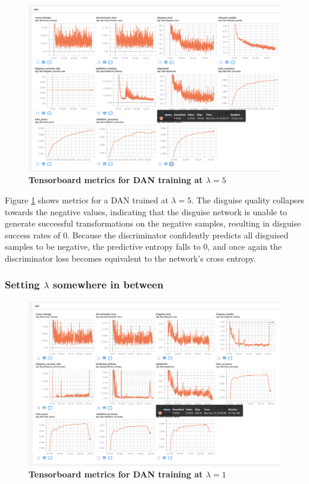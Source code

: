 \documentclass{proc}
\begin{document}
\begin{figure}[h!]
	\begin{center}
		\includegraphics*[scale=0.3]{../figures/tensorboard-exp-03.png}
		\caption{\textbf{Tensorboard metrics for DAN training at $\lambda = 5$}}
		\label{fig:tensorboard-exp-03}
	\end{center}
\end{figure}

Figure \ref{fig:tensorboard-exp-03} shows metrics for a DAN trained at $\lambda = 5$. The disguise quality collapses towards the negative values, indicating that the disguise network is unable to generate successful transformations on the negative samples, resulting in disguise success rates of $0$. Because the discriminator confidently predicts all disguised samples to be negative, the predictive entropy falls to $0$, and once again the discriminator loss becomes equivalent to the network's cross entropy.

\subsubsection{Setting $\lambda$ somewhere in between}

\begin{figure}[h!]
	\begin{center}
		\includegraphics*[scale=0.3]{../figures/tensorboard-exp-04.png}
		\caption{\textbf{Tensorboard metrics for DAN training at $\lambda = 1$}}
		\label{fig:tensorboard-exp-04}
	\end{center}
\end{figure}
\end{document}
